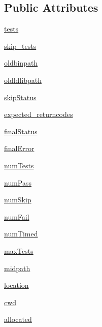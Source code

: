 \subsection*{Public Attributes}
\begin{DoxyCompactItemize}
\item 
\hyperlink{class_launcher_m_t_t_tool_1_1_launcher_m_t_t_tool_a2810a82208a2846540adffee0a6855f7}{tests}
\item 
\hyperlink{class_launcher_m_t_t_tool_1_1_launcher_m_t_t_tool_a03696ab743c22417d3be183903c20a68}{skip\-\_\-tests}
\item 
\hyperlink{class_launcher_m_t_t_tool_1_1_launcher_m_t_t_tool_acf34764e2b173537cbf5720cc0a1235d}{oldbinpath}
\item 
\hyperlink{class_launcher_m_t_t_tool_1_1_launcher_m_t_t_tool_abb2e78c53544b045ef3ab42ed8b68806}{oldldlibpath}
\item 
\hyperlink{class_launcher_m_t_t_tool_1_1_launcher_m_t_t_tool_a4d5ba97c121703a52364ba25f4a2546b}{skip\-Status}
\item 
\hyperlink{class_launcher_m_t_t_tool_1_1_launcher_m_t_t_tool_ae68abb344ae827a5ce0ee79446020c63}{expected\-\_\-returncodes}
\item 
\hyperlink{class_launcher_m_t_t_tool_1_1_launcher_m_t_t_tool_a24a3038f22807231f60be1efd39f7bcb}{final\-Status}
\item 
\hyperlink{class_launcher_m_t_t_tool_1_1_launcher_m_t_t_tool_a607ea8851059a23f64f5b1ef4590109e}{final\-Error}
\item 
\hyperlink{class_launcher_m_t_t_tool_1_1_launcher_m_t_t_tool_a397beae73724893629842d0031c64526}{num\-Tests}
\item 
\hyperlink{class_launcher_m_t_t_tool_1_1_launcher_m_t_t_tool_a92a3dc1fd9b7d2e9129d3a0968a871eb}{num\-Pass}
\item 
\hyperlink{class_launcher_m_t_t_tool_1_1_launcher_m_t_t_tool_affd7de54ccbc2c7f78b4afa06728f5e5}{num\-Skip}
\item 
\hyperlink{class_launcher_m_t_t_tool_1_1_launcher_m_t_t_tool_a17fe6e6f8981cc1f7cd1953cac37668a}{num\-Fail}
\item 
\hyperlink{class_launcher_m_t_t_tool_1_1_launcher_m_t_t_tool_ae2be62c3d068b4c1c3d7c1ddaf4cfdbe}{num\-Timed}
\item 
\hyperlink{class_launcher_m_t_t_tool_1_1_launcher_m_t_t_tool_aa8e59ca462ace6b189cd849a08afa639}{max\-Tests}
\item 
\hyperlink{class_launcher_m_t_t_tool_1_1_launcher_m_t_t_tool_a37f255feb0dac2f1eb0e6eff2746bd7b}{midpath}
\item 
\hyperlink{class_launcher_m_t_t_tool_1_1_launcher_m_t_t_tool_a13b93dfdaa7c433967c808d9bf54dcf9}{location}
\item 
\hyperlink{class_launcher_m_t_t_tool_1_1_launcher_m_t_t_tool_a7bcf1056b03f3777ef4ed39f7e063f36}{cwd}
\item 
\hyperlink{class_launcher_m_t_t_tool_1_1_launcher_m_t_t_tool_a79266b94da58ec136cca44c1f735d3a7}{allocated}
\end{DoxyCompactItemize}


